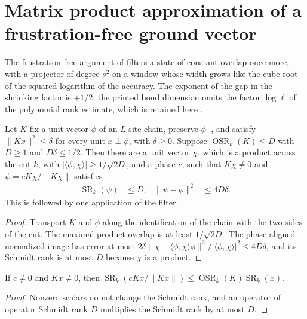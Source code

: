 \section{Matrix product approximation of a frustration-free ground vector}

The frustration-free argument of \cite[Section~5]{Arad2013AreaLaw} filters a
state of constant overlap once more, with a projector of degree $s^2$ on a
window whose width grows like the cube root of the squared logarithm of the
accuracy. The exponent of the gap in the shrinking factor is $+1/2$; the
printed bond dimension omits the factor $\log\ell$ of the polynomial rank
estimate, which is retained here \cite{gap:aklv13_frustration_free_mps_rate}.

\begin{lemma}
    \label{lem:aklv_ff_product_filtered_output}
    \leanok
    Let $K$ fix a unit vector $\phi$ of an $L$-site chain, preserve
    $\phi^\perp$, and satisfy $\|Kx\|^2\le\delta$ for every unit
    $x\perp\phi$, with $\delta\ge0$. Suppose
    $\operatorname{OSR}_k(K)\le D$ with $D\ge1$ and $D\delta\le1/2$.
    Then there are a unit vector $\chi$, which is a product across the cut
    $k$, with $|\langle\phi,\chi\rangle|\ge1/\sqrt{2D}$, and a phase $c$,
    such that $K\chi\ne0$ and $\psi=cK\chi/\|K\chi\|$ satisfies
    \begin{align*}
        \operatorname{SR}_k(\psi) & \le D,       &
        \|\psi-\phi\|^2           & \le4D\delta.
    \end{align*}
    This is \cite[Lemma~2.2]{Arad2013AreaLaw} followed by one application
    of the filter.
\end{lemma}
\begin{proof}
    \leanok
    Transport $K$ and $\phi$ along the identification of the chain with
    the two sides of the cut. The maximal product overlap is at least
    $1/\sqrt{2D}$. The phase-aligned normalized image has error at most
    $2\delta\|\chi-\langle\phi,\chi\rangle\phi\|^2/|\langle\phi,\chi\rangle|^2
        \le4D\delta$, and its Schmidt rank is at most $D$ because $\chi$ is
    a product.
\end{proof}

\begin{lemma}
    \label{lem:aklv_normalized_cut_schmidt_rank}
    \leanok
    If $c\ne0$ and $Kx\ne0$, then
    $\operatorname{SR}_k(cKx/\|Kx\|)\le\operatorname{OSR}_k(K)\operatorname{SR}_k(x)$.
\end{lemma}
\begin{proof}
    \leanok
    Nonzero scalars do not change the Schmidt rank, and an operator of
    operator Schmidt rank $D$ multiplies the Schmidt rank by at most $D$.
\end{proof}

